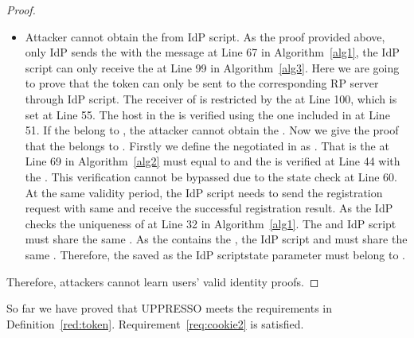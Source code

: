 \begin{proof}
\begin{itemize}
\item Attacker cannot obtain the  from IdP script. As the proof provided above, only IdP sends the  with the message at Line 67 in Algorithm~\ref{alg1}, the IdP script can only receive the  at  Line 99 in Algorithm~\ref{alg3}. Here we are going to prove that the token  can only be  sent to the corresponding RP server through IdP script. The receiver of  is restricted by the  at Line 100, which is set at Line 55. The host in the  is verified using the one included in  at Line 51. If the  belong to , the attacker cannot obtain the . Now we give the proof that the  belongs to . Firstly we define the negotiated  in  as . That is the  at Line 69 in Algorithm~\ref{alg2}  must equal to  and the  is verified at Line 44 with the . This verification cannot be bypassed due to the state check at Line 60. At the same validity period, the IdP script needs to send the registration request with same   and receive the successful registration result. As the IdP checks the uniqueness of  at  Line 32 in Algorithm~\ref{alg1}. The  and IdP script must share the same . As the  contains the , the IdP script and  must share the same . Therefore, the   saved as the IdP scriptstate parameter must belong to .
\end{itemize}
Therefore, attackers cannot  learn users' valid identity proofs.
\end{proof}
 So far we have proved that UPPRESSO meets the requirements in Definition~\ref{red:token}. Requirement~\ref{req:cookie2} is satisfied.

